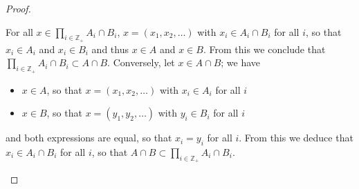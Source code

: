 \documentclass[11pt,a4paper,twoside]{article}
\theoremstyle{definition}
\begin{document}
\begin{proof}
\begin{enumerate}[(a)]
    For all $x \in \prod_{i \in \mathbb{Z}_+} A_i \cap B_i$, $x = (x_1, x_2, \dotsc)$ with $x_i \in A_i \cap B_i$ for all $i$, so that
    $x_i \in A_i$ and $x_i \in B_i$ and thus $x \in A$ and $x \in B$. From this we conclude that $\prod_{i \in \mathbb{Z}_+} A_i \cap B_i \subset A \cap B$.
    Conversely, let $x \in A \cap B$; we have
    \begin{itemize}
    \item $x \in A$, so that $x = (x_1, x_2, \dotsc)$ with $x_i \in A_i$ for all $i$
    \item $x \in B$, so that $x = (y_1, y_2, \dotsc)$ with $y_i \in B_i$ for all $i$
    \end{itemize}
    and both expressions are equal, so that $x_i = y_i$ for all $i$. From this we deduce that $x_i \in A_i \cap B_i$ for all $i$,
    so that $A \cap B \subset \prod_{i \in \mathbb{Z}_+} A_i \cap B_i$.

  \end{enumerate}

\end{proof}
\end{document}
